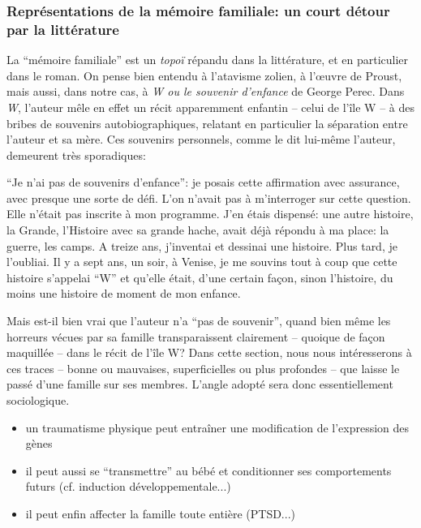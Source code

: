 \documentclass[french]{article}
\begin{document}
			\subsubsection{Représentations de la mémoire familiale: un court détour par la littérature}
			La ``mémoire familiale'' est un \textit{topoï} répandu dans la littérature, et en particulier dans le roman. On pense bien entendu à l'atavisme zolien, à l'œuvre de Proust, mais aussi, dans notre cas, à \textit{W ou le souvenir d'enfance} de George Perec. Dans \textit{W}, l'auteur mêle en effet un récit apparemment enfantin -- celui de l'île W -- à des bribes de souvenirs autobiographiques, relatant en particulier la séparation entre l'auteur et sa mère. Ces souvenirs personnels, comme le dit lui-même l'auteur, demeurent très sporadiques:
			\begin{center}
				\begin{minipage}{.7\textwidth}
					``Je n'ai pas de souvenirs d'enfance'': je posais cette affirmation avec assurance, avec presque une sorte de défi. L'on n'avait pas à m'interroger sur cette question. Elle n'était pas inscrite à mon programme. J'en étais dispensé: une autre histoire, la Grande, l'Histoire avec sa grande hache, avait déjà répondu à ma place: la guerre, les camps. A treize ans, j'inventai et dessinai une histoire. Plus tard, je l'oubliai. Il y a sept ans, un soir, à Venise, je me souvins tout à coup que cette histoire s'appelai ``W'' et qu'elle était, d'une certain façon, sinon l'histoire, du moins une histoire de moment de mon enfance.
				\end{minipage}
			\end{center}
			Mais est-il bien vrai que l'auteur n'a ``pas de souvenir'', quand bien même les horreurs vécues par sa famille transparaissent clairement -- quoique de façon maquillée -- dans le récit de l'île W? Dans cette section, nous nous intéresserons à ces traces -- bonne ou mauvaises, superficielles ou plus profondes -- que laisse le passé d'une famille sur ses membres. L'angle adopté sera donc essentiellement sociologique.\\
		\begin{itemize}
			\item un traumatisme physique peut entraîner une modification de l'expression des gènes
			\item il peut aussi se ``transmettre'' au bébé et conditionner ses comportements futurs (cf. induction développementale...)
			\item il peut enfin affecter la famille toute entière (PTSD...)
		\end{itemize}
\end{document}
